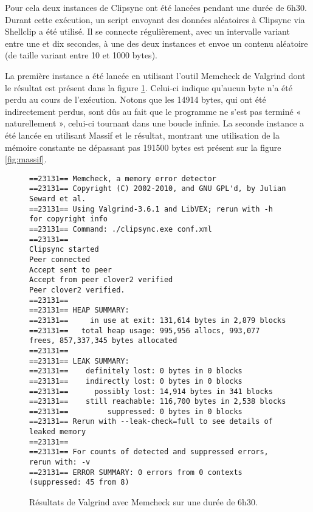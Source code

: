 Pour cela deux instances de Clipsync ont été lancées pendant une durée
de 6h30. Durant cette exécution, un script envoyant des données aléatoires
à Clipsync via Shellclip a été utilisé. Il se connecte régulièrement, avec
un intervalle variant entre une et dix secondes, à une des deux instances et
envoe un contenu aléatoire (de taille variant entre 10 et 1000 bytes).

La première instance a été lancée en utilisant l'outil
Memcheck de Valgrind dont le résultat est présent dans la figure
\ref{fig:memcheck}. Celui-ci indique qu'aucun byte n'a été perdu au cours
de l'exécution. Notons que les 14914 bytes, qui ont été indirectement perdus,
sont dûs au fait que le programme ne s'est pas terminé « naturellement »,
celui-ci tournant dans une boucle infinie.
La seconde instance a été lancée en utilisant Massif et le résultat,
montrant une utilisation de la mémoire constante ne dépassant pas 191500
bytes est présent sur la figure \ref{fig:massif}.

\begin{figure}[!h]
  \centering
  \scriptsize{
\begin{verbatim}
==23131== Memcheck, a memory error detector
==23131== Copyright (C) 2002-2010, and GNU GPL'd, by Julian Seward et al.
==23131== Using Valgrind-3.6.1 and LibVEX; rerun with -h for copyright info
==23131== Command: ./clipsync.exe conf.xml
==23131==
Clipsync started
Peer connected
Accept sent to peer
Accept from peer clover2 verified
Peer clover2 verified.
==23131==
==23131== HEAP SUMMARY:
==23131==     in use at exit: 131,614 bytes in 2,879 blocks
==23131==   total heap usage: 995,956 allocs, 993,077 frees, 857,337,345 bytes allocated
==23131==
==23131== LEAK SUMMARY:
==23131==    definitely lost: 0 bytes in 0 blocks
==23131==    indirectly lost: 0 bytes in 0 blocks
==23131==      possibly lost: 14,914 bytes in 341 blocks
==23131==    still reachable: 116,700 bytes in 2,538 blocks
==23131==         suppressed: 0 bytes in 0 blocks
==23131== Rerun with --leak-check=full to see details of leaked memory
==23131==
==23131== For counts of detected and suppressed errors, rerun with: -v
==23131== ERROR SUMMARY: 0 errors from 0 contexts (suppressed: 45 from 8)
\end{verbatim}
  }
  \caption{Résultats de Valgrind avec Memcheck sur une durée de 6h30.}
  \label{fig:memcheck}
\end{figure}

